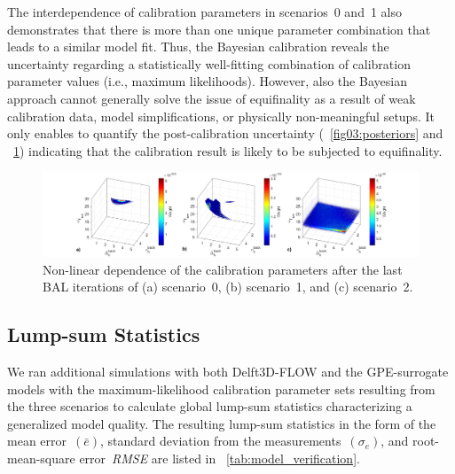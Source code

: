 \documentclass[draft,linenumbers,onecolumn]{agujournal2019} %
\begin{document}
The interdependence of calibration parameters in scenarios~0 and~1 also demonstrates that there is more than one unique parameter combination that leads to a similar model fit. Thus, the Bayesian calibration reveals the uncertainty regarding a statistically well-fitting combination of calibration parameter values (i.e., maximum likelihoods). However, also the Bayesian approach cannot generally solve the issue of equifinality as a result of weak calibration data, model simplifications, or physically non-meaningful setups. It only enables to quantify the post-calibration uncertainty (\figurename{~\ref{fig03:posteriors}} and \figurename{~\ref{fig04:interdependence}}) indicating that the calibration result is likely to be subjected to equifinality.


\begin{figure}
	\centering
	\includegraphics[width=14.5cm]{interdependence.png} %
	\caption{Non-linear dependence of the calibration parameters after the last BAL iterations of (a) scenario~0,  (b) scenario~1, and (c) scenario~2.}
	\label{fig04:interdependence}
\end{figure}

\subsection{Lump-sum Statistics}

We ran additional simulations with both Delft3D-FLOW and the GPE-surrogate models with the maximum-likelihood calibration parameter sets resulting from the three scenarios to calculate global lump-sum statistics characterizing a generalized model quality. The resulting lump-sum statistics in the form of the mean error~\((\bar{\textit{e}})\), standard deviation from the measurements~\((\sigma_e)\), and root-mean-square error~\textit{RMSE} are listed in \tablename{~\ref{tab:model_verification}}.
\end{document}

